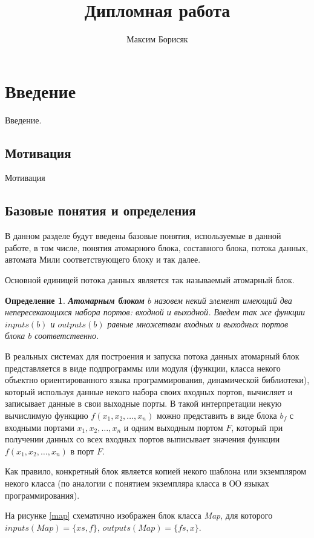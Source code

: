 \documentclass[10pt,a4paper]{article}
\author{Максим Борисяк}
\title{Дипломная работа}
\newtheorem{defen}{Определение}
\begin{document}
\maketitle

\section{Введение}

Введение.

\subsection{Мотивация}
Мотивация

\subsection{Базовые понятия и определения}
В данном разделе будут введены базовые понятия, используемые в данной работе, в том числе,
понятия атомарного блока, составного блока, потока данных, автомата Мили соответствующего блоку и так далее.

Основной единицей потока данных является так называемый атомарный блок.
\begin{defen}
  \textbf{Атомарным блоком} $b$ назовем некий элемент имеющий два непересекающихся набора портов: \textit{входной} и \textit{выходной}.
  Введем так же функции $inputs(b)$ и $outputs(b)$ равные множетвам входных и выходных портов блока $b$ соответственно.
\end{defen}

В реальных системах для построения и запуска потока данных атомарный блок представляется в виде подпрограммы или модуля
(функции, класса некого объектно ориентированного языка программирования, динамической библиотеки), который используя данные некого набора своих входных портов, вычисляет
и записывает данные в свои выходные порты.
В такой интерпретации некую вычислимую функцию $f(x_1, x_2, \dots, x_n)$ можно представить в виде блока $b_f$
с входными портами $x_1, x_2, \dots, x_n$ и одним выходным портом $F$, который при получении данных со всех входных портов
выписывает значения функции $f(x_1, x_2, \dots, x_n)$ в порт $F$.

Как правило, конкретный блок является копией некого шаблона или экземпляром некого класса (по аналогии с понятием экземпляра класса в ОО языках программирования).

На рисунке \ref{map} схематично изображен блок класса \textit{Map}, для которого $inputs(Map) = \{xs, f\}$, $outputs(Map) = \{fs, x\}$.
\end{document}
